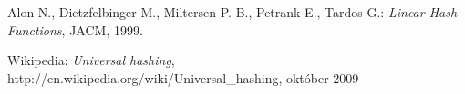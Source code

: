 \begin{thebibliography}{99}
 
 Alon N., Dietzfelbinger M., Miltersen P. B., Petrank E., Tardos G.: {\em Linear Hash Functions}, JACM, 1999.

  \begin{flushleft}
	Wikipedia: {\em Universal hashing},\\
	http://en.wikipedia.org/wiki/Universal{\_}hashing, október 2009
  \end{flushleft}

\end{thebibliography}

